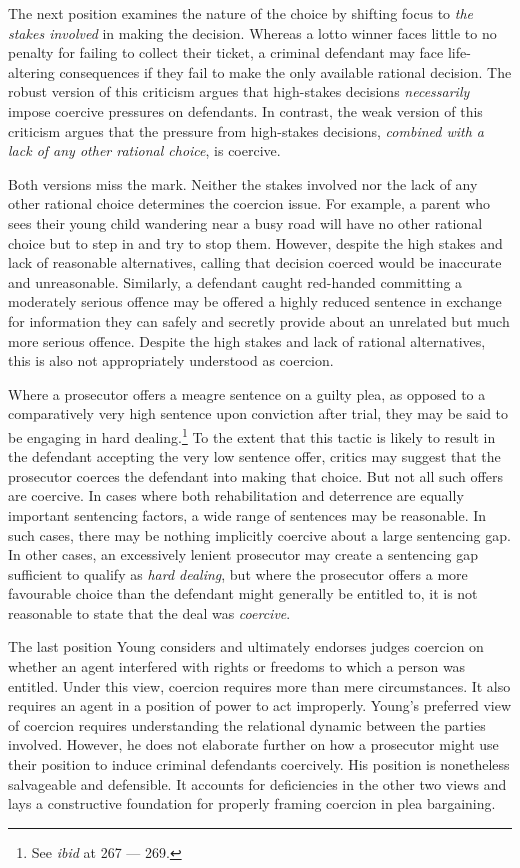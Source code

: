 The next position examines the nature of the choice by shifting focus to \textit{the stakes involved} in making the decision. Whereas a lotto winner faces little to no penalty for failing to collect their ticket, a criminal defendant may face life-altering consequences if they fail to make the only available rational decision. The robust version of this criticism argues that high-stakes decisions \textit{necessarily} impose coercive pressures on defendants. In contrast, the weak version of this criticism argues that the pressure from high-stakes decisions, \textit{combined with a lack of any other rational choice}, is coercive. 

Both versions miss the mark. Neither the stakes involved nor the lack of any other rational choice determines the coercion issue. For example, a parent who sees their young child wandering near a busy road will have no other rational choice but to step in and try to stop them. However, despite the high stakes and lack of reasonable alternatives, calling that decision coerced would be inaccurate and unreasonable. Similarly, a defendant caught red-handed committing a moderately serious offence may be offered a highly reduced sentence in exchange for information they can safely and secretly provide about an unrelated but much more serious offence. Despite the high stakes and lack of rational alternatives, this is also not appropriately understood as coercion.

Where a prosecutor offers a meagre sentence on a guilty plea, as opposed to a comparatively very high sentence upon conviction after trial, they may be said to be engaging in hard dealing.\footnote{See \textit{ibid} at 267 — 269.} To the extent that this tactic is likely to result in the defendant accepting the very low sentence offer, critics may suggest that the prosecutor coerces the defendant into making that choice. But not all such offers are coercive. In cases where both rehabilitation and deterrence are equally important sentencing factors, a wide range of sentences may be reasonable. In such cases, there may be nothing implicitly coercive about a large sentencing gap. In other cases, an excessively lenient prosecutor may create a sentencing gap sufficient to qualify as \textit{hard dealing}, but where the prosecutor offers a more favourable choice than the defendant might generally be entitled to, it is not reasonable to state that the deal was \textit{coercive}. 

The last position Young considers and ultimately endorses judges coercion on whether an agent interfered with rights or freedoms to which a person was entitled. Under this view, coercion requires more than mere circumstances. It also requires an agent in a position of power to act improperly. Young's preferred view of coercion requires understanding the relational dynamic between the parties involved. However, he does not elaborate further on how a prosecutor might use their position to induce criminal defendants coercively. His position is nonetheless salvageable and defensible. It accounts for deficiencies in the other two views and lays a constructive foundation for properly framing coercion in plea bargaining.

